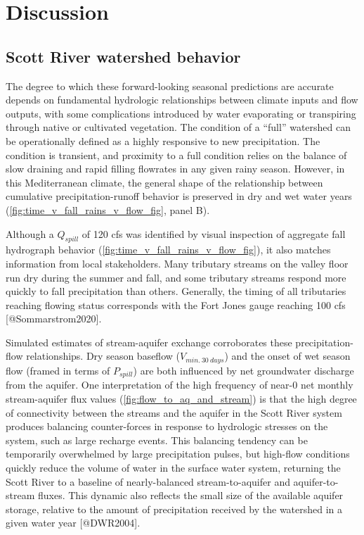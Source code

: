 \documentclass[
]{article}
\begin{document}
\hypertarget{discussion}{%
\section{Discussion}\label{discussion}}

\hypertarget{scott-river-watershed-behavior}{%
\subsection{Scott River watershed
behavior}\label{scott-river-watershed-behavior}}

The degree to which these forward-looking seasonal predictions are
accurate depends on fundamental hydrologic relationships between climate
inputs and flow outputs, with some complications introduced by water
evaporating or transpiring through native or cultivated vegetation. The
condition of a ``full'' watershed can be operationally defined as a
highly responsive to new precipitation. The condition is transient, and
proximity to a full condition relies on the balance of slow draining and
rapid filling flowrates in any given rainy season. However, in this
Mediterranean climate, the general shape of the relationship between
cumulative precipitation-runoff behavior is preserved in dry and wet
water years (\autoref{fig:time_v_fall_rains_v_flow_fig}, panel B).

Although a \(Q_{spill}\) of 120 cfs was identified by visual inspection
of aggregate fall hydrograph behavior
(\autoref{fig:time_v_fall_rains_v_flow_fig}), it also matches
information from local stakeholders. Many tributary streams on the
valley floor run dry during the summer and fall, and some tributary
streams respond more quickly to fall precipitation than others.
Generally, the timing of all tributaries reaching flowing status
corresponds with the Fort Jones gauge reaching 100 cfs
{[}@Sommarstrom2020{]}.

Simulated estimates of stream-aquifer exchange corroborates these
precipitation-flow relationships. Dry season baseflow
(\(V_{min.~30~days}\)) and the onset of wet season flow (framed in terms
of \(P_{spill}\)) are both influenced by net groundwater discharge from
the aquifer. One interpretation of the high frequency of near-0 net
monthly stream-aquifer flux values (\autoref{fig:flow_to_aq_and_stream})
is that the high degree of connectivity between the streams and the
aquifer in the Scott River system produces balancing counter-forces in
response to hydrologic stresses on the system, such as large recharge
events. This balancing tendency can be temporarily overwhelmed by large
precipitation pulses, but high-flow conditions quickly reduce the volume
of water in the surface water system, returning the Scott River to a
baseline of nearly-balanced stream-to-aquifer and aquifer-to-stream
fluxes. This dynamic also reflects the small size of the available
aquifer storage, relative to the amount of precipitation received by the
watershed in a given water year {[}@DWR2004{]}.
\end{document}
